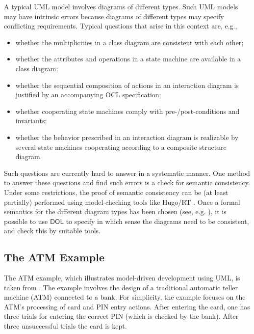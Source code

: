 \documentclass[10pt,fleqn,final]{scrreprt}
\newcommand*{\DOL}{\ensuremath{\mathsf{DOL}}\xspace}
\newcommand{\ssclause}[1]{\subsection{#1}}
\newenvironment{definitions}[0]{\medskip }{}
\begin{document}
\begin{definitions}
A typical UML model involves diagrams of different types. Such UML models may have intrinsic errors because diagrams of different types may specify conflicting 
requirements. Typical questions that arise in this context are, e.g.,

\begin{itemize}
\item whether the multiplicities in a class diagram are consistent with each other;
\item whether the attributes and operations in a state machine are
available in a class diagram;
\item	  whether the sequential composition of actions in an interaction diagram is justified by an accompanying OCL specification;
\item 	whether cooperating state machines comply with pre-/post-conditions and invariants;
\item 	whether the behavior prescribed in an interaction diagram is realizable by several state machines cooperating according to a composite structure diagram.
\end{itemize}
Such questions are currently hard to answer in a systematic manner. One method to answer these questions and find such errors is a check for semantic 
consistency. Under some restrictions, the proof of semantic consistency can be (at least partially) performed using model-checking tools like Hugo/RT \cite{knapp-wuttke:models06wsh:2007}. 
Once a formal semantics for the different diagram types has been chosen (see, e.g. \cite{knapp-mossakowski-roggenbach:corr:2014}), it is possible to use \DOL to specify in which 
sense the diagrams need to be consistent, and check this by suitable tools.


\ssclause{The ATM Example}
\label{sec:atm-example}

 The ATM example, which illustrates model-driven development using UML,
is taken from \cite{knapp-mossakowski-roggenbach:corr:2014}.  The example involves
the design of a traditional automatic teller machine (ATM) connected
to a bank. For simplicity,  the example focuses
 on the ATM's processing of card and PIN entry actions.  
After entering the card, one has three
trials for entering the correct PIN (which is checked by the
bank). After three unsuccessful trials the card is kept.


\end{definitions}
\end{document}
